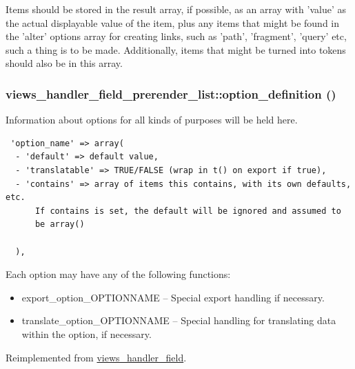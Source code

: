Items should be stored in the result array, if possible, as an array with 'value' as the actual displayable value of the item, plus any items that might be found in the 'alter' options array for creating links, such as 'path', 'fragment', 'query' etc, such a thing is to be made. Additionally, items that might be turned into tokens should also be in this array. \hypertarget{classviews__handler__field__prerender__list_3787d1e3974a37c72f71c062eee52b3d}{
\subsubsection[{option\_\-definition}]{\setlength{\rightskip}{0pt plus 5cm}views\_\-handler\_\-field\_\-prerender\_\-list::option\_\-definition ()}}
\label{classviews__handler__field__prerender__list_3787d1e3974a37c72f71c062eee52b3d}


Information about options for all kinds of purposes will be held here. 

\begin{Code}\begin{verbatim} 'option_name' => array(
  - 'default' => default value,
  - 'translatable' => TRUE/FALSE (wrap in t() on export if true),
  - 'contains' => array of items this contains, with its own defaults, etc.
      If contains is set, the default will be ignored and assumed to
      be array()

  ),
\end{verbatim}
\end{Code}

 Each option may have any of the following functions:\begin{itemize}
\item export\_\-option\_\-OPTIONNAME -- Special export handling if necessary.\item translate\_\-option\_\-OPTIONNAME -- Special handling for translating data within the option, if necessary. \end{itemize}


Reimplemented from \hyperlink{classviews__handler__field_64c69a8a3697603f8283405071c25b76}{views\_\-handler\_\-field}.

